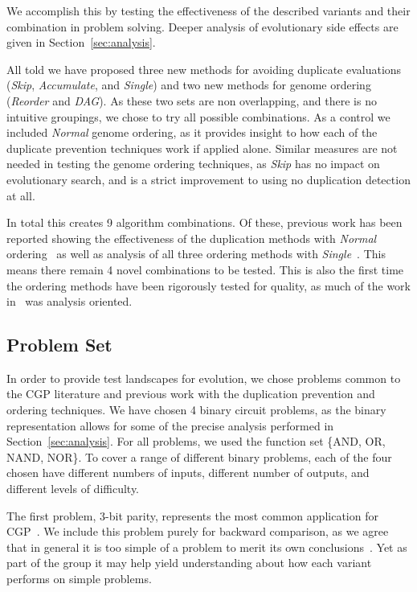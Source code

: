 \documentclass[journal]{IEEEtran}
\begin{document}
We accomplish this by testing the effectiveness
of the described variants and their combination in problem solving.  Deeper analysis of
evolutionary side effects are given in Section~\ref{sec:analysis}.

All told we have proposed three new methods for avoiding duplicate evaluations
(\emph{Skip}, \emph{Accumulate}, and \emph{Single}) and two new methods for
genome ordering (\emph{Reorder} and \emph{DAG}).  As these two
sets are non overlapping, and there is no intuitive groupings, we chose to try
all possible combinations.  As a control we included \emph{Normal} genome ordering,
as it provides insight to how each of the duplicate prevention techniques work
if applied alone.  Similar measures are not needed in testing the genome ordering techniques,
as \emph{Skip} has no impact on evolutionary search, and is a strict improvement
to using no duplication detection at all.

In total this creates 9 algorithm combinations.  Of these, previous work
has been reported showing the effectiveness of the duplication methods with \emph{Normal} ordering~\cite{goldman:2013:cgpwaste}
as well as analysis of all three ordering methods with \emph{Single}~\cite{goldman:2013:ordering}.
This means there remain 4 novel combinations to be tested.
This is also the first time the ordering methods
have been rigorously tested for quality, as much of the work in~\cite{goldman:2013:ordering}
was analysis oriented.

\subsection{Problem Set}
In order to provide test landscapes for evolution, we chose problems common to
the CGP literature and previous work with the duplication prevention and ordering
techniques.  We have chosen 4 binary circuit problems, as the binary representation
allows for some of the precise analysis performed in Section~\ref{sec:analysis}.
For all problems, we used the function set \{AND, OR, NAND, NOR\}.
To cover a range of different binary problems, each of the four chosen have
different numbers of inputs, different number of outputs, and different levels
of difficulty.

The first problem, 3-bit parity, represents the most
common application for
CGP~\cite{yu:2001:neutrality,miller:2006:redundancy,walker:2008:cgpmodules}.
We include this problem purely for backward comparison, as we agree that in general
it is too simple of a problem to merit its own conclusions~\cite{white:2013:bgpb}.
Yet as part of the group it may help yield understanding about how each variant
performs on simple problems.
\end{document}
